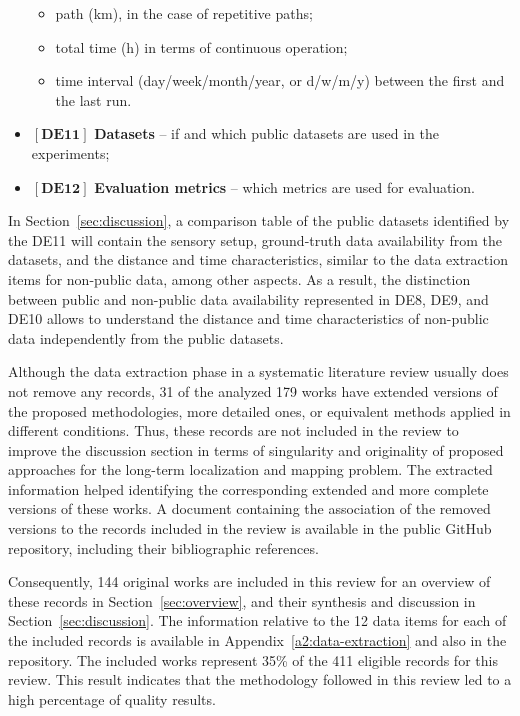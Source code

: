 \begin{itemize}[nosep]
\begin{itemize}[nosep]
  \item path (km), in the case of repetitive paths;
  \item total time (h) in terms of continuous operation;
  \item time interval (day/week/month/year, or d/w/m/y) between the first and the last run.
  \end{itemize}
\item $\left[\textbf{DE11}\right]$ \textbf{Datasets} -- if and which public datasets are used in the experiments;
\item $\left[\textbf{DE12}\right]$ \textbf{Evaluation metrics} -- which metrics are used for evaluation.
\end{itemize}

In Section~\ref{sec:discussion}, a comparison table of the public datasets identified by the DE11 will contain the sensory setup, ground-truth data availability from the datasets, and the distance and time characteristics, similar to the data extraction items for non-public data, among other aspects. As a result, the distinction between public and non-public data availability represented in DE8, DE9, and DE10 allows to understand the distance and time characteristics of non-public data independently from the public datasets.

Although the data extraction phase in a systematic literature review usually does not remove any records, 31 of the analyzed 179 works have extended versions of the proposed methodologies, more detailed ones, or equivalent methods applied in different conditions.
Thus, these records are not included in the review to improve the discussion section in terms of singularity and originality of proposed approaches for the long-term localization and mapping problem.
The extracted information helped identifying the corresponding extended and more complete versions of these works.
A document containing the association of the removed versions to the records included in the review is available in the public GitHub repository, including their bibliographic references. 

Consequently, 144 original works are included in this review for an overview of these records in Section~\ref{sec:overview}, and their synthesis and discussion in Section~\ref{sec:discussion}. The information relative to the 12 data items for each of the included records is available in Appendix~\ref{a2:data-extraction} and also in the repository. The included works represent 35\% of the 411 eligible records for this review. This result indicates that the methodology followed in this review led to a high percentage of quality results.

